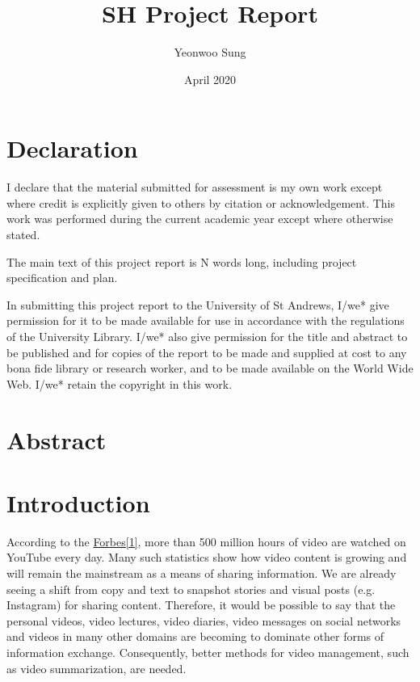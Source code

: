 \documentclass{article}
\title{SH Project Report}
\author{Yeonwoo Sung}
\date{April 2020}
\begin{document}
\maketitle

\newpage

\section*{Declaration}
I declare that the material submitted for assessment is my own work except where credit is explicitly given to others by citation or acknowledgement. 
This work was performed during the current academic year except where otherwise stated.

The main text of this project report is N words long, including project specification and plan.

In submitting this project report to the University of St Andrews, I/we* give permission for it to be made 
available for use in accordance with the regulations of the University Library. I/we* also give permission for 
the title and abstract to be published and for copies of the report to be made and supplied at cost to any bona fide 
library or research worker, and to be made available on the World Wide Web. I/we* retain the copyright in this work.

\newpage

\section*{Abstract}

\newpage

\tableofcontents

\newpage

\section{Introduction}

According to the \hyperlink{ref1}{Forbes[1]}, more than 500 million hours of video are watched on YouTube every day. Many such statistics show how video content is growing and will remain the mainstream as a means of sharing information. We are already seeing a shift from copy and text to snapshot stories and visual posts (e.g. Instagram) for sharing content. Therefore, it would be possible to say that the personal videos, video lectures, video diaries, video messages on social networks and videos in many other domains are becoming to dominate other forms of information exchange. Consequently, better methods for video management, such as video summarization, are needed.
\end{document}
